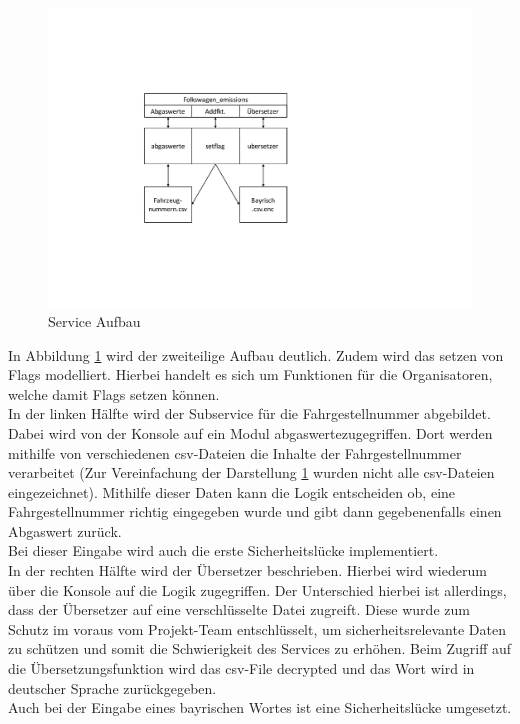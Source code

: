 \begin{figure}[H]
\centering
\includegraphics[scale=1]{bilder/ictf/Aufbau_Service.pdf}%
\caption{Service Aufbau}%
\label{serviceAufbau}%
\end{figure}


In Abbildung \ref{serviceAufbau} wird der zweiteilige Aufbau deutlich. Zudem wird das setzen von Flags modelliert. Hierbei handelt es sich um Funktionen für die Organisatoren, welche damit Flags setzen können.
\\

In der linken Hälfte wird der Subservice für die Fahrgestellnummer abgebildet. Dabei wird von der Konsole auf ein Modul \glqq abgaswerte\grqq zugegriffen. Dort werden mithilfe von verschiedenen csv-Dateien die Inhalte der Fahrgestellnummer verarbeitet (Zur Vereinfachung der Darstellung \ref{serviceAufbau} wurden nicht alle csv-Dateien eingezeichnet). Mithilfe dieser Daten kann die Logik entscheiden ob, eine Fahrgestellnummer richtig eingegeben wurde und gibt dann gegebenenfalls einen Abgaswert zurück. \\
Bei dieser Eingabe wird auch die erste Sicherheitslücke implementiert.
\\

In der rechten Hälfte wird der Übersetzer beschrieben. Hierbei wird wiederum über die Konsole auf die Logik zugegriffen. Der Unterschied hierbei ist allerdings, dass der Übersetzer auf eine verschlüsselte Datei zugreift. Diese wurde zum Schutz im voraus vom Projekt-Team entschlüsselt, um sicherheitsrelevante Daten zu schützen und somit die Schwierigkeit des Services zu erhöhen. Beim Zugriff auf die Übersetzungsfunktion wird das csv-File decrypted und das Wort wird in deutscher Sprache zurückgegeben. \\
Auch bei der Eingabe eines bayrischen Wortes ist eine Sicherheitslücke umgesetzt.
\\

